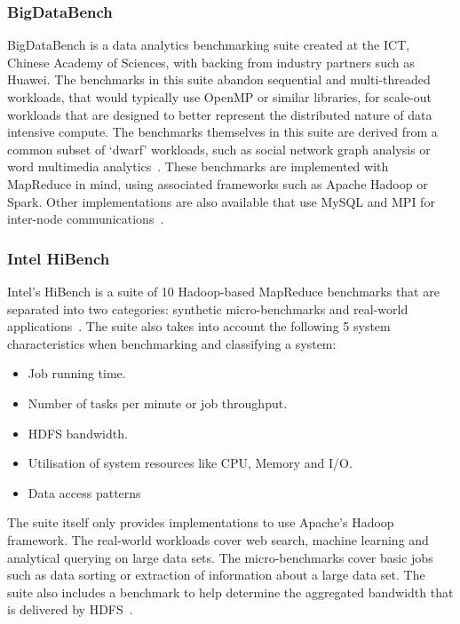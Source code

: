 \documentclass[12pt,a4paper]{article}
\begin{document}
            \subsubsection{BigDataBench}
            \label{ssub:bigdatabench}

            	BigDataBench is a data analytics benchmarking suite created at the ICT, Chinese Academy of Sciences, with backing from industry partners such as Huawei. The benchmarks in this suite abandon sequential and multi-threaded workloads, that would typically use OpenMP or similar libraries, for scale-out~\cite{big-data-bench-home} workloads that are designed to better represent the distributed nature of data intensive compute. The benchmarks themselves in this suite are derived from a common subset of `dwarf' workloads, such as social network graph analysis or word multimedia analytics~\cite{dwarf-workloads-big-data}. These benchmarks are implemented with MapReduce in mind, using associated frameworks such as Apache Hadoop or Spark. Other implementations are also available that use MySQL and MPI for inter-node communications~\cite{big-data-bench-home}.
            
            \subsubsection{Intel HiBench}
            \label{ssub:intel_hibench}

                Intel's HiBench is a suite of 10 Hadoop-based MapReduce benchmarks that are separated into two categories: synthetic micro-benchmarks and real-world applications~\cite{hibench-techreport}. The suite also takes into account the following 5 system characteristics when benchmarking and classifying a system:

                \begin{itemize}
                    \item Job running time.
                    \item Number of tasks per minute or job throughput.
                    \item HDFS bandwidth.
                    \item Utilisation of system resources like CPU, Memory and I/O.
                    \item Data access patterns
                \end{itemize}

                The suite itself only provides implementations to use Apache's Hadoop framework. The real-world workloads cover web search, machine learning and analytical querying on large data sets. The micro-benchmarks cover basic jobs such as data sorting or extraction of information about a large data set. The suite also includes a benchmark to help determine the aggregated bandwidth that is delivered by HDFS~\cite{hibench-techreport-2}.
            
\end{document}

